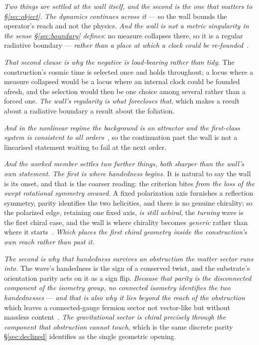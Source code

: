 \documentclass[11pt,a4paper]{article}
\theoremstyle{plain}
\theoremstyle{definition}
\begin{document}
\emph{Two things are settled at the wall itself, and the second is the one that matters to
\S\ref{sec:object}.} \emph{The dynamics continues across it} --- so the wall bounds the operator's reach and
not the physics. \emph{And the wall is not a metric singularity in the sense \S\ref{sec:boundary} defines}:
no measure collapses there, so it is a regular radiative boundary --- \emph{rather than a place at which a
clock could be re-founded}~\cite{JanzenDynamics}.

\emph{That second clause is why the negative is load-bearing rather than tidy.} The construction's cosmic
time is selected once and holds throughout; a locus where a measure collapsed would be a locus where an
internal clock could be founded afresh, and the selection would then be one choice among several rather than
a forced one. \emph{The wall's regularity is what forecloses that}, which makes a result about a radiative
boundary a result about the foliation.

\emph{And in the nonlinear regime the background is an attractor and the first-class system is consistent to
all orders}~\cite{JanzenDynamics}, so the continuation past the wall is not a linearised statement waiting to
fail at the next order.

\emph{And the worked member settles two further things, both sharper than the wall's own statement.} \emph{The first is
where handedness begins.} It is natural to say the wall is its onset, and that is the coarser reading: the
criterion bites \emph{from the loss of the swept rotational symmetry onward}. A fixed polarization axis
furnishes a reflection symmetry, parity identifies the two helicities, and there is no genuine chirality; so
the polarized edge, retaining one fixed axis, \emph{is still achiral}, the \emph{turning} wave is the first
chiral case, and the wall is where chirality becomes \emph{generic} rather than where it
starts~\cite{JanzenDynamics}. \emph{Which places the first chiral geometry inside the construction's own
reach rather than past it.}

\emph{The second is why that handedness survives an obstruction the matter sector runs into.} The wave's
handedness is the sign of a conserved twist, and the substrate's orientation parity acts on it as a sign
flip. \emph{Because that parity is the disconnected component of the isometry group, no connected isometry
identifies the two handednesses} --- \emph{and that is also why it lies beyond the reach of the
obstruction} which leaves a connected-gauge fermion sector not vector-like but without massless
content~\cite{JanzenDynamics,JanzenBoundary}. \emph{The
gravitational sector is chiral precisely through the component that obstruction cannot touch}, which is the
same discrete parity \S\ref{sec:declined} identifies as the single geometric opening.
\end{document}
